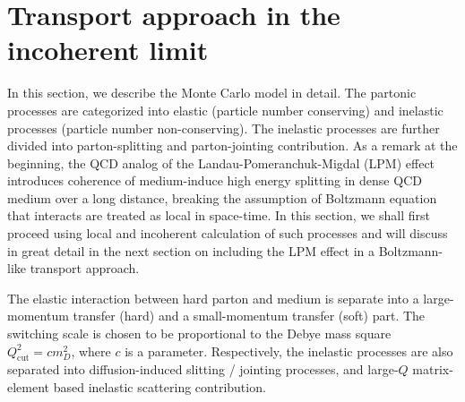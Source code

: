 \documentclass[aps, prc, reprint, amsmath, groupedaddress, nofootinbib]{revtex4-1}
\begin{document}
\section{Transport approach in the incoherent limit}\label{section:MC}
In this section, we describe the Monte Carlo model in detail. The partonic processes are categorized into elastic (particle number conserving) and inelastic processes (particle number non-conserving). 
The inelastic processes are further divided into parton-splitting and parton-jointing contribution. 
As a remark at the beginning, the QCD analog of the Landau-Pomeranchuk-Migdal (LPM) effect introduces coherence of medium-induce high energy splitting in dense QCD medium over a long distance, breaking the assumption of Boltzmann equation that interacts are treated as local in space-time.
In this section, we shall first proceed using local and incoherent calculation of such processes and will discuss in great detail in the next section on including the LPM effect in a Boltzmann-like transport approach.

The elastic interaction between hard parton and medium is separate into a large-momentum transfer (hard) and a small-momentum transfer (soft) part.
The switching scale is chosen to be proportional to the Debye mass square $Q_{\textrm{cut}}^2 = c m_D^2$, where $c$ is a parameter.
Respectively, the inelastic processes are also separated into diffusion-induced slitting / jointing processes, and large-$Q$ matrix-element based inelastic scattering contribution.
\end{document}
